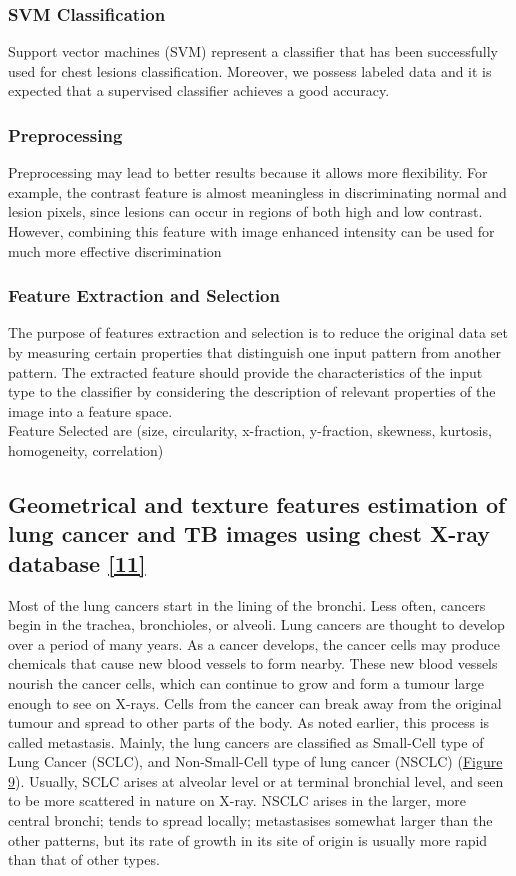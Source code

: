 \documentclass[hidelinks,12pt]{article}
\begin{document}
\subsubsection{SVM Classification}
Support vector machines (SVM) represent a classifier that has been successfully used
for chest lesions classification. Moreover, we possess labeled data and it is expected
that a supervised classifier achieves a good accuracy.

\subsubsection{Preprocessing}
Preprocessing may lead to better results because it allows more flexibility. For example,
the contrast feature is almost meaningless in discriminating normal and lesion
pixels, since lesions can occur in regions of both high and low contrast. However,
combining this feature with image enhanced intensity can be used for much more
effective discrimination

\subsubsection{Feature Extraction and Selection}
The purpose of features extraction and selection is to reduce the original data set by
measuring certain properties that distinguish one input pattern from another pattern.
The extracted feature should provide the characteristics of the input type to the classifier
by considering the description of relevant properties of the image into a feature
space. \\
Feature Selected are (size, circularity, x-fraction, y-fraction, skewness, kurtosis, homogeneity, correlation)


\newpage
\subsection{Geometrical and texture features estimation of lung cancer and TB images using chest X-ray database \hyperref[11]{[11]}}

Most of the lung cancers start in the lining of the bronchi. Less often, cancers begin
in the trachea, bronchioles, or alveoli. Lung cancers are thought to develop over a period
of many years. As a cancer develops, the cancer cells may produce chemicals that cause
new blood vessels to form nearby. These new blood vessels nourish the cancer cells,
which can continue to grow and form a tumour large enough to see on X-rays. Cells from
the cancer can break away from the original tumour and spread to other parts of the body.
As noted earlier, this process is called metastasis.
Mainly, the lung cancers are classified as Small-Cell type of Lung Cancer (SCLC),
and Non-Small-Cell type of lung cancer (NSCLC) (\hyperref[fig:8]{Figure 9}). Usually, SCLC arises at
alveolar level or at terminal bronchial level, and seen to be more scattered in nature on
X-ray. NSCLC arises in the larger, more central bronchi; tends to spread locally;
metastasises somewhat larger than the other patterns, but its rate of growth in its site of
origin is usually more rapid than that of other types.
\end{document}
